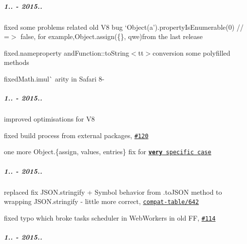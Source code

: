 \subparagraph*{1.. -\/ 2015..}


\begin{DoxyItemize}
\item fixed some problems related old V8 bug `Object(\textquotesingle{}a').property\+Is\+Enumerable(0) // =$>$ false{\ttfamily , for example,}Object.\+assign(\{\}, \textquotesingle{}qwe\textquotesingle{}){\ttfamily from the last release}
\item {\ttfamily fixed}.name{\ttfamily property and}Function\+::to\+String$<$tt$>$conversion some polyfilled methods
\item fixedMath.\+imul\`{} arity in Safari 8-\/
\end{DoxyItemize}

\subparagraph*{1.. -\/ 2015..}


\begin{DoxyItemize}
\item improved optimisations for V8
\item fixed build process from external packages, \href{https://github.com/zloirock/core-js/pull/120}{\tt \#120}
\item one more {\ttfamily Object.\{assign, values, entries\}} fix for \href{https://github.com/ljharb/proposal-object-values-entries/issues/5}{\tt {\bfseries very} specific case}
\end{DoxyItemize}

\subparagraph*{1.. -\/ 2015..}


\begin{DoxyItemize}
\item replaced fix {\ttfamily J\+S\+O\+N.\+stringify} + {\ttfamily Symbol} behavior from {\ttfamily .to\+J\+S\+ON} method to wrapping {\ttfamily J\+S\+O\+N.\+stringify} -\/ little more correct, \href{https://github.com/kangax/compat-table/pull/642}{\tt compat-\/table/642}
\item fixed typo which broke tasks scheduler in Web\+Workers in old FF, \href{https://github.com/zloirock/core-js/pull/114}{\tt \#114}
\end{DoxyItemize}

\subparagraph*{1.. -\/ 2015..}


